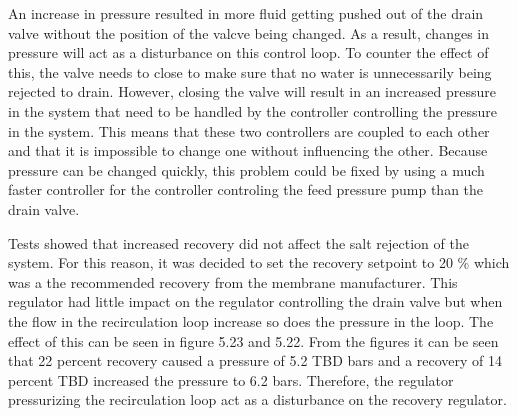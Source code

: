 
An increase in pressure resulted in more fluid getting pushed out of the drain valve without the position of the valcve being changed. As a result, changes in pressure will act as a disturbance on this control loop. To counter the effect of this, the valve needs to close to make sure that no water is unnecessarily being rejected to drain. However, closing the valve will result in an increased pressure in the system that need to be handled by the controller controlling the pressure in the system. This means that these two controllers are coupled to each other and that it is impossible to change one without influencing the other. Because pressure can be changed quickly, this problem could be fixed by using a much faster controller for the controller controling the feed pressure pump than the drain valve.

Tests showed that increased recovery did not affect the salt rejection of the system. For this reason, it was decided to set the recovery setpoint to 20 \% which was a the recommended recovery from the membrane manufacturer. This regulator had little impact on the regulator controlling the drain valve but when the flow in the recirculation loop increase so does the pressure in the loop. The effect of this can be seen in figure 5.23 and 5.22. From the figures it can be seen that 22 percent recovery caused a pressure of 5.2 TBD bars and a recovery of 14 percent TBD increased the pressure to 6.2 bars. Therefore, the regulator pressurizing the recirculation loop act as a disturbance on the recovery regulator.

